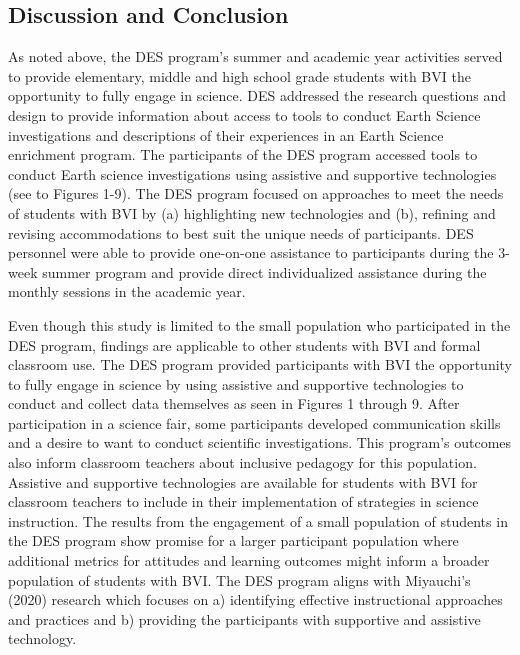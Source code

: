 \documentclass[11.5pt]{sig-alternate}
\begin{document}
\begin{large}
\section*{Discussion and Conclusion}

As noted above, the DES program’s summer and academic year activities served to provide elementary, middle and high school grade students with BVI the opportunity to fully engage in science. DES addressed the research questions and design to provide information about access to tools to conduct Earth Science investigations and descriptions of their experiences in an Earth Science enrichment program. The participants of the DES program accessed tools to conduct Earth science investigations using assistive and supportive technologies (see to Figures 1-9).  The DES program focused on approaches to meet the needs of students with BVI by (a) highlighting new technologies and (b), refining and revising accommodations to best suit the unique needs of participants. DES personnel were able to provide one-on-one assistance to participants during the 3-week summer program and provide direct individualized assistance during the monthly sessions in the academic year. 

Even though this study is limited to the small population who participated in the DES program, findings are applicable to other students with BVI and formal classroom use. The DES program provided participants with BVI the opportunity to fully engage in science by using assistive and supportive technologies to conduct and collect data themselves as seen in Figures 1 through 9.  After participation in a science fair, some participants developed communication skills and a desire to want to conduct scientific investigations.  This program’s outcomes also inform classroom teachers about inclusive pedagogy for this population.  Assistive and supportive technologies are available for students with BVI for classroom teachers to include in their implementation of strategies in science instruction. The results from the engagement of a small population of students in the DES program show promise for a larger participant population where additional metrics for attitudes and learning outcomes might inform a broader population of students with BVI. The DES program aligns with Miyauchi’s (2020) research which focuses on a) identifying effective instructional approaches and practices and b) providing the participants with supportive and assistive technology. 


\end{large}
\end{document}
